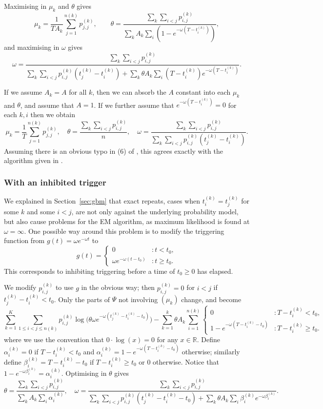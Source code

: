 \documentclass[twoside,a4paper]{article}
\theoremstyle{plain}
\theoremstyle{definition}
\begin{document}
Maximising in $\mu_k$ and $\theta$ gives
\[ \mu_k = \frac{1}{T A_k} \sum_{j=1}^{n(k)} p^{(k)}_{j,j},
\qquad
\theta = \frac{\sum_k \sum_{i<j} p^{(k)}_{i,j}}{\sum_k A_k \sum_i (1-e^{-\omega(T-t^{(k)}_i)})},
\]
and maximising in $\omega$ gives
\[ \omega = \frac{\sum_k \sum_{i<j} p^{(k)}_{i,j}}{
\sum_k \sum_{i<j} p^{(k)}_{i,j} (t^{(k)}_j - t^{(k)}_i)
+ \sum_k \theta A_k \sum_i (T-t^{(k)}_i) e^{-\omega(T-t^{(k)}_i)}
}. \]

If we assume $A_k=A$ for all $k$, then we can absorb the $A$ constant into each $\mu_k$
and $\theta$, and assume that $A=1$.  If we further assume that $e^{-\omega(T-t^{(k)}_i)}=0$
for each $k,i$ then we obtain
\[ \mu_k = \frac{1}{T} \sum_{j=1}^{n(k)} p^{(k)}_{j,j},
\quad
\theta = \frac{\sum_k \sum_{i<j} p^{(k)}_{i,j}}{n},
\quad
\omega = \frac{\sum_k \sum_{i<j} p^{(k)}_{i,j}}{
\sum_k \sum_{i<j} p^{(k)}_{i,j} (t^{(k)}_j - t^{(k)}_i)}. \]
Assuming there is an obvious typo in (6) of \cite{sepp2},
this agrees exactly with the algorithm given in \cite[Section~2.2]{sepp2}.


\subsubsection{With an inhibited trigger}\label{app:grid_model_em_inhib}

We explained in Section~\ref{sec:gbm} that exact repeats, cases when $t^{(k)}_i = t^{(k)}_j$
for some $k$ and some $i < j$, are not only against the underlying probability model, but
also cause problems for the EM algorithm, as maximum likelihood is found at $\omega=\infty$.
One possible way around this problem is to modify the triggering function from $g(t) = \omega
e^{-\omega t}$ to
\[ g(t) = \begin{cases} 0 &: t<t_0, \\ \omega e^{-\omega(t-t_0)} &: t\geq t_0.
\end{cases} \]
This corresponds to inhibiting triggering before a time of $t_0 \geq 0$ has elapsed.

We modify $p^{(k)}_{i,j}$ to use $g$ in the obvious way; then $p^{(k)}_{i,j} = 0$ for
$i<j$ if $t^{(k)}_j - t^{(k)}_i < t_0$.
Only the parts of $\Psi$ not involving $(\mu_k)$ change, and become
\[ \sum_{k=1}^K \sum_{1 \leq i<j\leq n(k)} p^{(k)}_{i,j}
\log\big( \theta\omega e^{-\omega(t^{(k)}_j - t^{(k)}_i - t_0)} \big)
- \sum_{k=1}^k \theta A_k \sum_{i=1}^{n(k)}
\begin{cases} 0 &: T - t^{(k)}_i < t_0, \\
1 - e^{-\omega(T - t^{(k)}_i - t_0)} &: T - t^{(k)}_i \geq t_0. \end{cases} \]
where we use the convention that $0\cdot \log(x) = 0$ for any $x\in\mathbb R$.
Define $\alpha^{(k)}_i = 0$ if $T - t^{(k)}_i < t_0$ and
$\alpha^{(k)}_i = 1 - e^{-\omega(T - t^{(k)}_i - t_0)}$ otherwise; similarly
define $\beta^{(k)}_i = T - t^{(k)}_i - t_0$ if $T - t^{(k)}_i \geq t_0$ or $0$
otherwise.  Notice that $1 - e^{-\omega \beta^{(k)}_i} = \alpha^{(k)}_i$.
Optimising in $\theta$ gives
\[ \theta = \frac{\sum_k \sum_{i<j} p^{(k)}_{i,j}}
{\sum_k A_k \sum_i \alpha^{(k)}_i},
\quad
\omega = \frac{\sum_k \sum_{i<j} p^{(k)}_{i,j}}
{\sum_k \sum_{i<j} p^{(k)}_{i,j}(t^{(k)}_j - t^{(k)}_i - t_0)
+ \sum_k \theta A_k \sum_i \beta^{(k)}_i e^{-\omega\beta^{(k)}_i}
}. \]
\end{document}
